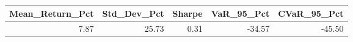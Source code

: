 \begin{tabular}{rrrrr}
\toprule
Mean_Return_Pct & Std_Dev_Pct & Sharpe & VaR_95_Pct & CVaR_95_Pct \\
\midrule
7.87 & 25.73 & 0.31 & -34.57 & -45.50 \\
\bottomrule
\end{tabular}
